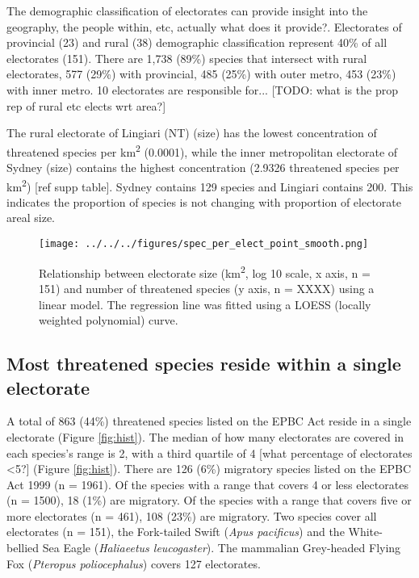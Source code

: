\documentclass[a4paper,11pt]{article}
\begin{document}
The demographic classification of electorates can provide insight into the geography, the people within, etc, actually what does it provide?. Electorates of provincial (23) and rural (38) demographic classification represent 40\% of all electorates (151). There are 1,738 (89\%) species that intersect with rural electorates, 577 (29\%) with provincial, 485 (25\%) with outer metro, 453 (23\%) with inner metro. 
10 electorates are responsible for...
[TODO: what is the prop rep of rural etc elects wrt area?]

The rural electorate of Lingiari (NT) (size) has the lowest concentration of threatened species per km\textsuperscript{2} (0.0001), while the inner metropolitan electorate of Sydney (size) contains the highest concentration (2.9326 threatened species per km\textsuperscript{2}) [ref supp table]. Sydney contains 129 species and Lingiari contains 200. This indicates the proportion of species is not changing with proportion of electorate areal size.

\begin{figure}[H]
	\centering
    \texttt{[image: ../../../figures/spec\_per\_elect\_point\_smooth.png]}
    \caption{Relationship between electorate size (km\textsuperscript{2}, log 10 scale, x axis, n = 151) and number of threatened species (y axis, n = XXXX) using a linear model. The regression line was fitted using a LOESS (locally weighted polynomial) curve.}
    \label{fig:point_smooth}
\end{figure}

\subsection{Most threatened species reside within a single electorate}

A total of 863 (44\%) threatened species listed on the EPBC Act reside in a single electorate (Figure \ref{fig:hist}). 
The median of how many electorates are covered in each species's range is 2, with a third quartile of 4 [what percentage of electorates <5?] (Figure \ref{fig:hist}). There are 126 (6\%) migratory species listed on the EPBC Act 1999 (n = 1961). 
Of the species with a range that covers 4 or less electorates (n = 1500), 18 (1\%) are migratory. Of the species with a range that covers five or more electorates (n = 461), 108 (23\%) are migratory. Two species cover all electorates (n = 151), the Fork-tailed Swift (\emph{Apus pacificus}) and the White-bellied Sea Eagle (\emph{Haliaeetus leucogaster}). The mammalian Grey-headed Flying Fox (\emph{Pteropus poliocephalus}) covers 127 electorates. 
\end{document}
